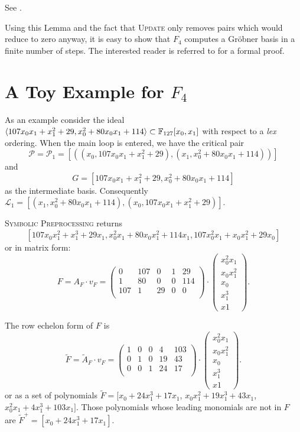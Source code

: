 \begin{citeproof}
See  \cite[p.10]{f4}.
\end{citeproof}


Using this Lemma and the fact that \textsc{Update} only removes pairs which would reduce to zero anyway, it is easy to show that $F_4$ computes a Gröbner basis in a finite number of steps. The interested reader is referred to \cite{f4} for a formal proof.

\section{A Toy Example for \texorpdfstring{$F_4$}{F4}}
As an example consider the ideal $\langle {107x_{0}x_{1} + x_{1}^{2} + 29, x_{0}^{2} + 80 x_{0}x_{1} + 114} \rangle \subset \mathbb{F}_{127}[x_{0}, x_{1}]$ with respect to a \emph{lex} ordering.
When the main loop is entered, we have the critical pair $$\mathcal{P} = \mathcal{P}_1 = [ ((x_0, 107x_0x_1 + x_1^2 + 29), (x_1, x_0^2 + 80x_0x_1 + 114))]$$ and $$G = [107x_0x_1 + x_1^2 + 29, x_0^2 + 80x_0x_1 + 114]$$ as the intermediate basis.
Consequently $\mathcal{L}_1 = [(x_1, x_0^2+ 80x_0x_1 + 114), (x_0, 107x_0x_1 +  x_1^2 + 29)]$.

\textsc{Symbolic Preprocessing} returns $$[107x_0x_1^2 + x_1^3 + 29x_1,  x_0^2x_1 + 80x_0x_1^2 + 114x_1, 107x_0^2x_1 + x_0x_1^2 + 29x_0]$$ or in matrix form:
\[
F = A_F \cdot v_F = \left( \begin{array}{ccccc}
0 & 107 & 0 & 1 & 29\\
1 & 80 & 0 &0 & 114\\
107 & 1 & 29 & 0 & 0\\
\end{array}\right) \cdot 
\left(\begin{array}{c}
x_0^2x_1\\ x_0x_1^2\\ x_0\\ x_1^3\\ x1
\end{array}\right).
\]

The row echelon form of $F$ is
\[
\tilde{F} = \tilde{A}_F \cdot v_F = \left( \begin{array}{ccccc}
1 & 0 & 0 & 4  & 103\\
0 & 1 & 0 & 19 & 43\\
0 & 0 & 1 & 24 & 17\\
\end{array}\right) \cdot 
\left(\begin{array}{c}
x_0^2x_1\\ x_0x_1^2\\ x_0\\ x_1^3\\ x1
\end{array}\right).
\]
or as a set of polynomials $\tilde{F} = [x_0 + 24x_1^3 + 17x_1$, $x_0x_1^2+ 19x_1^3  + 43x_1$, 
$x_0^2x_1 + 4x_1^3 + 103x_1]$. Those polynomials whose leading monomials are not in $F$ are $\tilde{F}^+ = [x_0 + 24x_1^3  + 17x_1]$.



